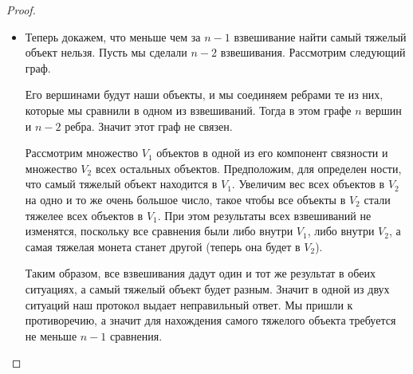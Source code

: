 \documentclass[a4paper]{article}
\theoremstyle{named}
\begin{document}
\begin{colloq}
\begin{proof}
\begin{itemize}[leftmargin=*]
            \item
                Теперь докажем, что меньше чем за $n - 1$ взвешивание найти самый тяжелый объект нельзя. Пусть мы сделали $n - 2$ взвешивания. Рассмотрим следующий граф.
                
                Его вершинами будут наши объекты, и мы соединяем ребрами те из них, которые мы сравнили в одном из взвешиваний. Тогда в этом графе $n$ вершин и $n - 2$ ребра. Значит этот граф не связен. 
                
                Рассмотрим множество $V_1$ объектов в одной из его компонент связности и множество $V_2$ всех остальных объектов. Предположим, для определен ности, что самый тяжелый объект находится в $V_1$. Увеличим вес всех объектов в $V_2$ на одно и то же очень большое число, такое чтобы все объекты в $V_2$ стали тяжелее всех объектов в $V_1$. При этом результаты всех взвешиваний не изменятся, поскольку все сравнения были либо внутри $V_1$, либо внутри $V_2$, а самая тяжелая монета станет другой (теперь она будет в $V_2$). 
                
                Таким образом, все взвешивания дадут один и тот же результат в обеих ситуациях, а самый тяжелый объект будет разным. Значит в одной из двух ситуаций наш протокол выдает неправильный ответ. Мы пришли к противоречию, а значит для нахождения самого тяжелого объекта требуется не меньше $n - 1$ сравнения.
            \end{itemize}
        \end{proof}

    \end{colloq}
\end{document}
